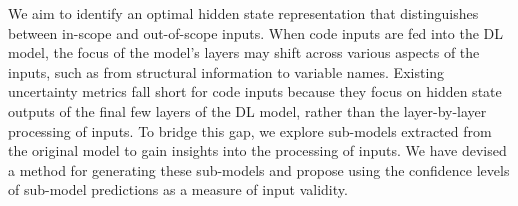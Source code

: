 



We aim to identify an optimal hidden state representation that distinguishes between in-scope and out-of-scope inputs. When code inputs are fed into the DL model, the focus of the model's layers may shift across various aspects of the inputs, such as from structural information to variable names. Existing uncertainty metrics fall short for code inputs because they focus on hidden state outputs of the final few layers of the DL model,  rather than the layer-by-layer processing of inputs. To bridge this gap, we explore sub-models extracted from the original model to gain insights into the processing of inputs. We have devised a method for generating these sub-models and propose using the confidence levels of sub-model predictions as a measure of input validity. 

